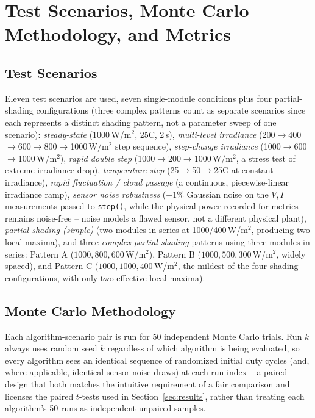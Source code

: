 \section{Test Scenarios, Monte Carlo Methodology, and Metrics}
\label{sec:scenarios}

\subsection{Test Scenarios}
Eleven test scenarios are used, seven single-module conditions plus four
partial-shading configurations (three complex patterns count as separate
scenarios since each represents a distinct shading pattern, not a
parameter sweep of one scenario):
\emph{steady-state} (1000\,W/m$^2$, 25\textdegree C, 2\,s), \emph{multi-level
irradiance} (200$\to$400$\to$600$\to$800$\to$1000\,W/m$^2$ step sequence),
\emph{step-change irradiance} (1000$\to$600$\to$1000\,W/m$^2$),
\emph{rapid double step} (1000$\to$200$\to$1000\,W/m$^2$, a stress test of
extreme irradiance drop), \emph{temperature step}
(25$\to$50$\to$25\textdegree C at constant irradiance), \emph{rapid
fluctuation / cloud passage} (a continuous, piecewise-linear irradiance
ramp), \emph{sensor noise robustness} ($\pm1\%$ Gaussian noise on the $V,I$
measurements passed to \texttt{step()}, while the physical power recorded
for metrics remains noise-free -- noise models a flawed sensor, not a
different physical plant), \emph{partial shading (simple)} (two modules in
series at 1000/400\,W/m$^2$, producing two local maxima), and three
\emph{complex partial shading} patterns using three modules in series:
Pattern A ($1000,800,600$\,W/m$^2$), Pattern B ($1000,500,300$\,W/m$^2$,
widely spaced), and Pattern C ($1000,1000,400$\,W/m$^2$, the mildest of the
four shading configurations, with only two effective local maxima).

\subsection{Monte Carlo Methodology}
Each algorithm-scenario pair is run for 50 independent Monte Carlo trials.
Run $k$ always uses random seed $k$ regardless of which algorithm is being
evaluated, so every algorithm sees an identical sequence of randomized
initial duty cycles (and, where applicable, identical sensor-noise draws)
at each run index -- a paired design that both matches the intuitive
requirement of a fair comparison and licenses the paired $t$-tests used in
Section~\ref{sec:results}, rather than treating each algorithm's 50 runs as
independent unpaired samples.


